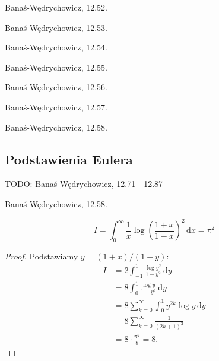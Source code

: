 \begin{problem}
    Banaś-Wędrychowicz, 12.52.
\end{problem}

\begin{problem}
    Banaś-Wędrychowicz, 12.53.
\end{problem}

\begin{problem}
    Banaś-Wędrychowicz, 12.54.
\end{problem}

\begin{problem}
    Banaś-Wędrychowicz, 12.55.
\end{problem}

\begin{problem}
    Banaś-Wędrychowicz, 12.56.
\end{problem}

\begin{problem}
    Banaś-Wędrychowicz, 12.57.
\end{problem}

\begin{problem}
    Banaś-Wędrychowicz, 12.58.
\end{problem}

\subsection{Podstawienia Eulera}

TODO: Banaś Wędrychowicz, 12.71 - 12.87

\begin{problem}
    Banaś-Wędrychowicz, 12.58.
\end{problem}

\begin{problem}
    \begin{equation}
        I = \int_0^\infty \frac{1}{x} \log \left(\frac{1+x}{1-x}\right)^2 \,\mathrm{d}x = \pi^2
    \end{equation}
\end{problem}

\begin{proof}
    Podstawiamy $y = (1+x) / (1-y)$:
    \begin{align}
        I & = 2 \int_{-1}^1 \frac{\log y^2}{1-y^2} \,\mathrm{d}y \\
          & = 8 \int_0^1 \frac{\log y}{1-y^2} \, \mathrm{d}{y} \\
          & = 8 \sum_{k=0}^\infty \int_0^1 y^{2k} \log y \,\mathrm{d} y \\
          & = 8 \sum_{k=0}^\infty \frac{1}{(2k+1)^2} \\
          & = 8 \cdot \frac{\pi^2}{8} = 8.
    \end{align}
\end{proof}